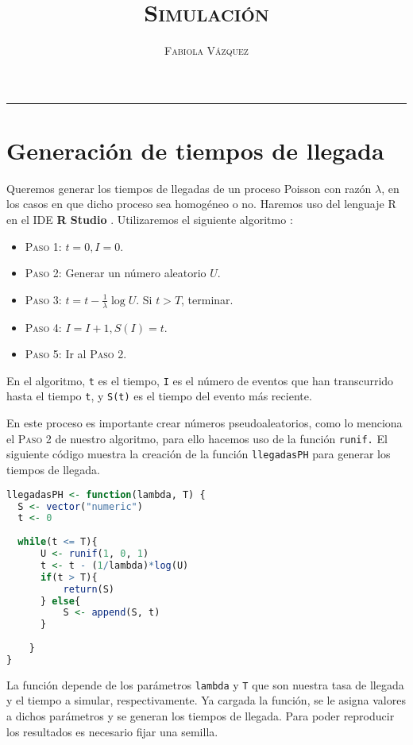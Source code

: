 \documentclass[12pt,letterpaper]{article}
\title{\textsc{Simulación}}
\author{\textsc{Fabiola Vázquez}}
\date{}
\begin{document}
\maketitle
\hrule
\section{Generación de tiempos de llegada}
Queremos generar los tiempos de llegadas de un proceso Poisson con razón $\lambda$, en los casos en que dicho proceso sea homogéneo o no. Haremos uso del lenguaje R \cite{R} en el IDE \textbf{R Studio} \cite{rstudio}. Utilizaremos el siguiente algoritmo \cite{SimulacionRoss}:


\begin{itemize}
\item[]\textsc{Paso 1}: $t=0, I=0.$
\item[]\textsc{Paso 2}: Generar un número aleatorio $U$.
\item[]\textsc{Paso 3}: $t=t-\frac{1}{\lambda}\log U.$ Si $t>T$, terminar.
\item[]\textsc{Paso 4}: $I=I+1, S(I)=t$.
\item[]\textsc{Paso 5:} Ir al \textsc{Paso 2.}
\end{itemize}
En el algoritmo, \texttt{t} es el tiempo, \texttt{I} es el número de eventos que han transcurrido hasta el tiempo \texttt{t}, y  \texttt{S(t)} es el tiempo del evento más reciente.

En este proceso es importante crear números pseudoaleatorios, como lo menciona el \textsc{Paso 2} de nuestro algoritmo, para ello hacemos uso de la función \texttt{runif.} El siguiente código muestra la creación de la función \texttt{llegadasPH} para generar los tiempos de llegada. 



\begin{lstlisting}[language=R]
llegadasPH <- function(lambda, T) {
  S <- vector("numeric")
  t <- 0
    
  while(t <= T){
      U <- runif(1, 0, 1)
      t <- t - (1/lambda)*log(U)
      if(t > T){
          return(S)
      } else{
          S <- append(S, t)
      }
    
    }
}
\end{lstlisting}
La función depende de los parámetros \texttt{lambda} y \texttt{T} que son nuestra tasa de llegada y el tiempo a simular, respectivamente. Ya cargada la función, se le asigna valores a dichos parámetros y se generan los tiempos de llegada. Para poder reproducir los resultados es necesario fijar una semilla.
\end{document}

